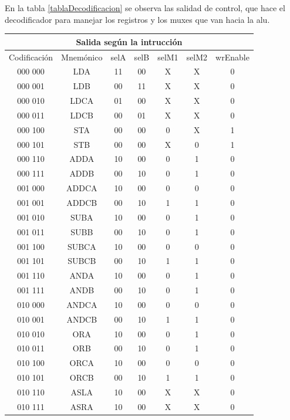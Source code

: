 \documentclass[paper=letter, fontsize=12pt]{article}
\begin{document}
En la tabla \ref{tablaDecodificacion} se observa las salidad de control, que hace el decodificador para manejar los registros y los muxes que van hacia la alu.

\begin{table}
\centering
\begin{tabular}{cc|ccccc}
\multicolumn{7}{c}{Salida según la intrucción} \\ \hline
Codificación& Mnemónico	  	& selA & selB & selM1 & selM2 & wrEnable \\ \hline
000 000 	& LDA 		  	& 11 	& 00    & X     & X     & 0 \\
000 001		& LDB  			& 00 	& 11    & X     & X     & 0 \\           
000 010 	& LDCA 			& 01 	& 00    & X     & X     & 0 \\            
000 011 	& LDCB 			& 00 	& 01    & X     & X     & 0 \\           
000 100 	& STA  	 		& 00 	& 00    & 0     & X     & 1 \\            
000 101 	& STB  			& 00 	& 00    & X     & 0     & 1 \\            
000 110 	& ADDA			& 10 	& 00    & 0     & 1     & 0 \\
000 111 	& ADDB			& 00 	& 10    & 0     & 1     & 0 \\
001 000 	& ADDCA			& 10 	& 00    & 0     & 0     & 0 \\
001 001 	& ADDCB			& 00 	& 10    & 1     & 1     & 0 \\
001 010 	& SUBA			& 10 	& 00    & 0     & 1     & 0 \\
001 011 	& SUBB			& 00 	& 10    & 0     & 1     & 0 \\
001 100 	& SUBCA			& 10 	& 00    & 0     & 0     & 0 \\
001 101 	& SUBCB			& 00 	& 10    & 1     & 1     & 0 \\
001 110 	& ANDA			& 10 	& 00    & 0     & 1     & 0 \\
001 111 	& ANDB			& 00 	& 10    & 0    	& 1     & 0 \\
010 000 	& ANDCA			& 10 	& 00    & 0     & 0     & 0 \\
010 001 	& ANDCB			& 00 	& 10    & 1     & 1     & 0 \\
010 010 	& ORA			& 10 	& 00    & 0     & 1     & 0 \\
010 011 	& ORB			& 00 	& 10    & 0     & 1     & 0 \\
010 100 	& ORCA			& 10 	& 00    & 0     & 0     & 0 \\
010 101 	& ORCB			& 00 	& 10    & 1     & 1     & 0 \\
010 110 	& ASLA			& 10 	& 00    & X     & X     & 0 \\
010 111 	& ASRA			& 10 	& 00    & X     & X     & 0 \\
	

\end{tabular}
\end{table}
\end{document}
